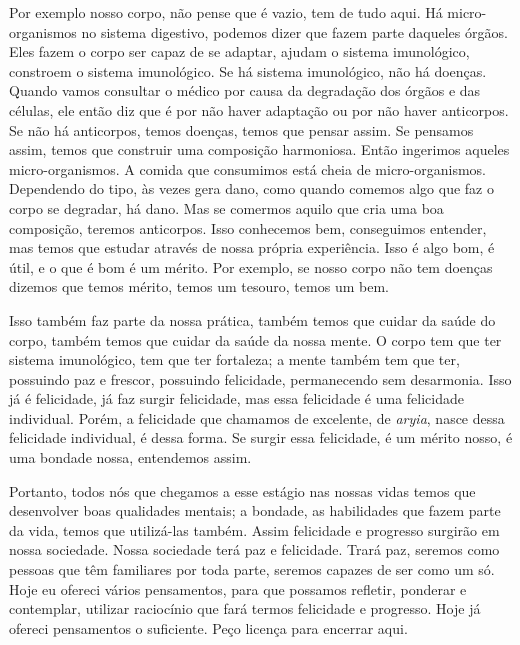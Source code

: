 Por exemplo nosso corpo, não pense que é vazio, tem de tudo aqui. Há
micro-organismos no sistema digestivo, podemos dizer que fazem parte
daqueles órgãos. Eles fazem o corpo ser capaz de se adaptar, ajudam o
sistema imunológico, constroem o sistema imunológico. Se há sistema
imunológico, não há doenças. Quando vamos consultar o médico por causa
da degradação dos órgãos e das células, ele então diz que é por não
haver adaptação ou por não haver anticorpos. Se não há anticorpos,
temos doenças, temos que pensar assim. Se pensamos assim, temos que
construir uma composição harmoniosa. Então ingerimos aqueles
micro-organismos. A comida que consumimos está cheia de
micro-organismos. Dependendo do tipo, às vezes gera dano, como quando
comemos algo que faz o corpo se degradar, há dano. Mas se comermos
aquilo que cria uma boa composição, teremos anticorpos. Isso conhecemos
bem, conseguimos entender, mas temos que estudar através de nossa
própria experiência. Isso é algo bom, é útil, e o que é bom é um
mérito. Por exemplo, se nosso corpo não tem doenças dizemos que temos
mérito, temos um tesouro, temos um bem. 

Isso também faz parte da nossa prática, também temos que cuidar da
saúde do corpo, também temos que cuidar da saúde da nossa mente. O
corpo tem que ter sistema imunológico, tem que ter
fortaleza; a mente também tem que ter,
possuindo paz e frescor, possuindo felicidade, permanecendo sem
desarmonia. Isso já é felicidade, já faz surgir felicidade, mas essa
felicidade é uma felicidade individual. Porém, a felicidade que
chamamos de excelente, de \textit{aryia}, nasce dessa felicidade
individual, é dessa forma. Se surgir essa felicidade, é um mérito
nosso, é uma bondade nossa, entendemos assim. 

Portanto, todos nós que chegamos a esse estágio nas nossas vidas
temos que desenvolver boas qualidades
mentais; a bondade, as habilidades que fazem
parte da vida, temos que utilizá-las também. Assim felicidade e
progresso surgirão em nossa sociedade. Nossa
sociedade terá paz e felicidade. Trará paz, seremos como pessoas que
têm familiares por toda parte, seremos capazes de ser como um só. Hoje
eu ofereci vários pensamentos, para que possamos refletir, ponderar e
contemplar, utilizar raciocínio que fará termos felicidade e progresso.
Hoje já ofereci pensamentos o suficiente. Peço licença para encerrar
aqui.

